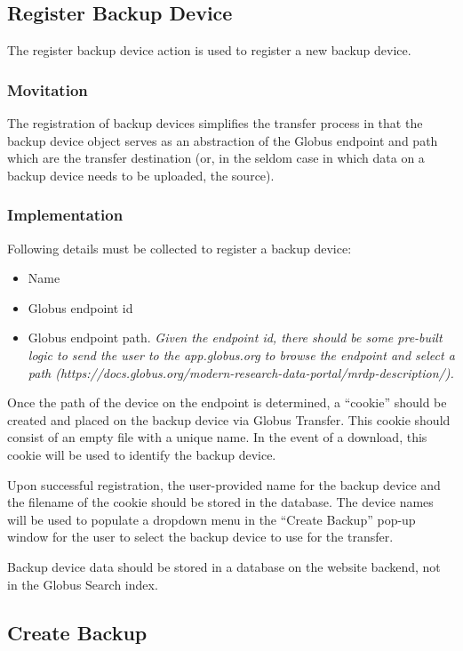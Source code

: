 \subsection{Register Backup Device}

The register backup device action is used to register a new backup device.

\subsubsection{Movitation}
The registration of backup devices simplifies the transfer process in that the 
backup device object serves as an abstraction of the Globus endpoint and path 
which are the transfer destination (or, in the seldom case in which data on 
a backup device needs to be uploaded, the source).

\subsubsection{Implementation}
Following details must be collected to register a backup device:
\begin{itemize}\itemsep1pt
    \item Name
    \item Globus endpoint id
    \item Globus endpoint path. \emph{Given the endpoint id, there should be some pre-built logic to send the user to
the app.globus.org to browse the endpoint and select a path (https://docs.globus.org/modern-research-data-portal/mrdp-description/).}
\end{itemize}

\noindent 
Once the path of the device on the endpoint is determined, a ``cookie'' should be 
created and placed on the backup device via Globus Transfer. This cookie should
consist of an empty file with a unique name. In the event of a download, this 
cookie will be used to identify the backup device.

Upon successful registration, the user-provided name for the backup device and the 
filename of the cookie should be stored in the database. The device names will be 
used to populate a dropdown menu in the ``Create Backup'' pop-up window for the
user to select the backup device to use for the transfer.

Backup device data should be stored in a database on the website backend, not in
the Globus Search index.

\subsection{Create Backup}

